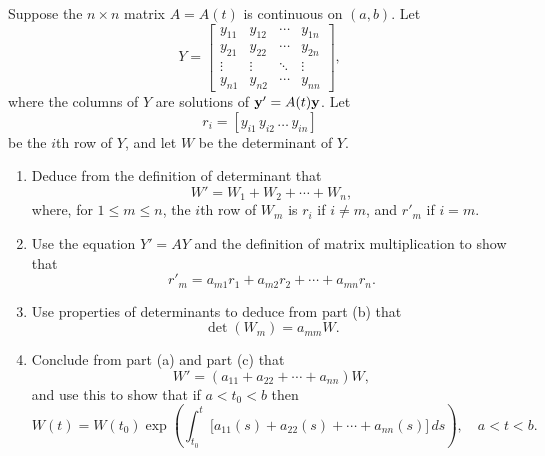 \documentclass{ximera}
\begin{document}
\begin{problem}\label{exer:10.3.5}
Suppose  the $n\times n$ matrix $A=A(t)$ is continuous on $(a,b)$. Let
$$
 Y=
\begin{bmatrix} y_{11}&y_{12}&\cdots&y_{1n} \\
y_{21}&y_{22}&\cdots&y_{2n} \\
\vdots&\vdots&\ddots&\vdots \\
y_{n1}&y_{n2}&\cdots&y_{nn}
\end{bmatrix},
$$
where the columns of $Y$ are solutions of ${\bf y}'=A(t){\bf y}$. Let
$$
r_i=[y_{i1}\, y_{i2}\, \dots\, y_{in}]
$$
be the $i$th row of $Y$, and let $W$ be the determinant of $Y$.

\begin{enumerate}
\item %
 Deduce from the definition of  determinant that
$$
W'=W_1+W_2+\cdots+W_n,
$$
where, for $1 \le m \le n$, the $i$th row of $W_m$ is $r_i$ if $i \ne m$,
and $r'_m$ if $i=m$.

\item %
 Use the equation $Y'=A Y$
and the definition of matrix multiplication to show that
$$
r'_m=a_{m1}r_1+a_{m2} r_2+\cdots+a_{mn}r_n.
$$

\item %
 Use  properties of determinants to deduce
from part (b) that
$$
\det (W_m)=a_{mm}W.
$$

\item %
 Conclude from part (a) and part (c) that
$$
W'=(a_{11}+a_{22}+\cdots+a_{nn})W,
$$
and use this to  show that  if $a<t_0<b$ then
$$
W(t)=W(t_0)\exp\left(
\int^t_{t_0}\big[a_{11}(s)+a_{22}(s)+\cdots+a_{nn}(s)]\,
ds\right), \quad a < t < b.
$$
\end{enumerate}
\end{problem}
\end{document}

